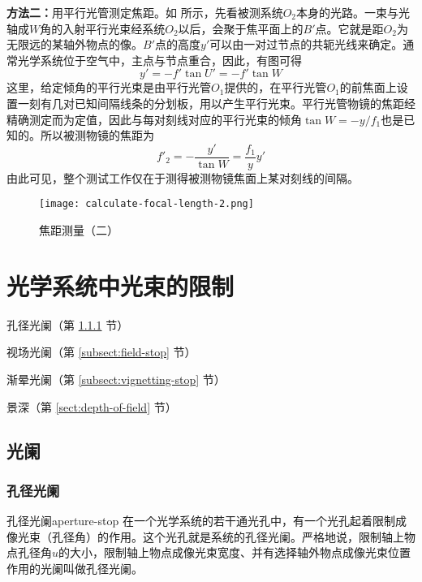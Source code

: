 \documentclass[cn,10pt,chinesefont=founder,math=newtx,cite=super,twoside]{elegantbook}
\begin{document}
\textbf{方法二：}用平行光管测定焦距。如 所示，先看被测系统$O_2$本身的光路。一束与光轴成$W$角的入射平行光束经系统$O_2$以后，会聚于焦平面上的$B'$点。它就是距$O_2$为无限远的某轴外物点的像。$B'$点的高度$y'$可以由一对过节点的共轭光线来确定。通常光学系统位于空气中，主点与节点重合，因此，有图可得
\begin{equation}
y'=-f'\tan U'=-f'\tan W
\end{equation}
这里，给定倾角的平行光束是由平行光管$O_1$提供的，在平行光管$O_1$的前焦面上设置一刻有几对已知间隔线条的分划板，用以产生平行光束。平行光管物镜的焦距经精确测定而为定值，因此与每对刻线对应的平行光束的倾角$\tan W=-y/f_1$也是已知的。所以被测物镜的焦距为
\begin{equation}
f'_2=-\frac{y'}{\tan W}=\frac{f_1}{y}y'
\end{equation}
由此可见，整个测试工作仅在于测得被测物镜焦面上某对刻线的间隔。

\begin{figure}[htbp]
	\centering
	\texttt{[image: calculate-focal-length-2.png]}
	\caption{焦距测量（二）}
	\label{fig:calculate-focal-length-2}
\end{figure}

\chapter{光学系统中光束的限制}

\begin{introduction}
	\item 孔径光阑（第 \ref{subsect:aperture-stop} 节）
	\item 视场光阑（第 \ref{subsect:field-stop} 节）
	\item 渐晕光阑（第 \ref{subsect:vignetting-stop} 节）
	\item 景深（第 \ref{sect:depth-of-field} 节）
\end{introduction}

\section{光阑}
\subsection{孔径光阑}
\label{subsect:aperture-stop}
\begin{definition}{孔径光阑}{aperture-stop}
在一个光学系统的若干通光孔中，有一个光孔起着限制成像光束（孔径角）的作用。这个光孔就是系统的孔径光阑。严格地说，限制轴上物点孔径角$u$的大小，限制轴上物点成像光束宽度、并有选择轴外物点成像光束位置作用的光阑叫做孔径光阑。
\end{definition}
\end{document}
